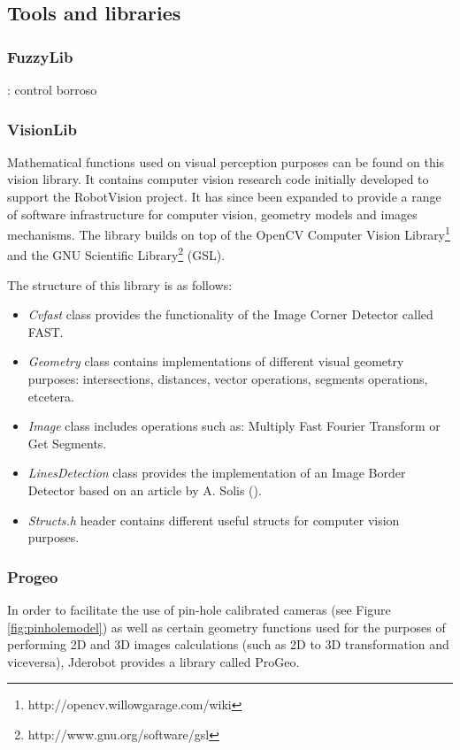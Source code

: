 \documentclass[twocolumn]{svjour3}          %
\begin{document}
\subsection{Tools and libraries}

\subsubsection{FuzzyLib}: control borroso
\subsubsection{VisionLib}
\label{subsec:visionlib}

Mathematical functions used on visual perception purposes can be found on this vision library. It contains computer vision research code initially developed to support the RobotVision project. It has since been expanded to provide a range of software infrastructure for computer vision, geometry models and images mechanisms. The library builds on top of the OpenCV Computer Vision Library\footnote{http://opencv.willowgarage.com/wiki} and the GNU Scientific Library\footnote{http://www.gnu.org/software/gsl} (GSL).

The structure of this library is as follows:
\begin{itemize} 
\item \textit{Cvfast} class provides the functionality of the Image Corner Detector called FAST.
\item \textit{Geometry} class contains implementations of different visual geometry purposes: intersections, distances, vector operations, segments operations, etcetera.
\item \textit{Image} class includes operations such as: Multiply Fast Fourier Transform or Get Segments.
\item \textit{LinesDetection} class provides the implementation of an Image Border Detector based on an article by A. Solis (\cite{solis09}).
\item \textit{Structs.h} header contains different useful structs for computer vision purposes.
\end{itemize}

\subsubsection{Progeo}
\label{subsec:progeo}

In order to facilitate the use of pin-hole calibrated cameras (see Figure \ref{fig:pinholemodel}) as well as certain geometry functions used for the purposes of performing 2D and 3D images calculations (such as 2D to 3D transformation and viceversa), Jderobot provides a library called ProGeo.
\end{document}
